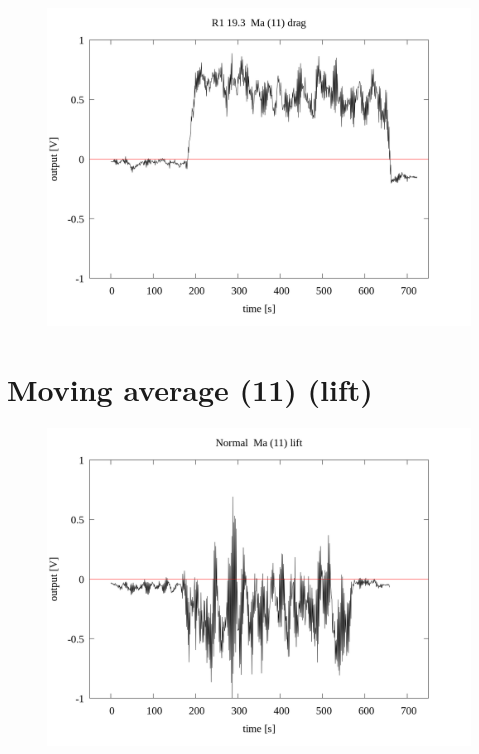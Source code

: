 \documentclass[a4paper]{jsarticle}
\begin{document}
\begin{figure}[htbp]
    \footnotesize
    \begin{center}
        \includegraphics[width=140mm]{../../../33_result/210806/moving_average/11/drag/R1_19.3_ma(11)_drag.png}
    \end{center}
\end{figure}

\section{Moving average (11) (lift)}

\begin{figure}[htbp]
    \footnotesize
    \begin{center}
        \includegraphics[width=140mm]{../../../33_result/210806/moving_average/11/lift/Normal_ma(11)_lift.png}
    \end{center}
\end{figure}
\end{document}
